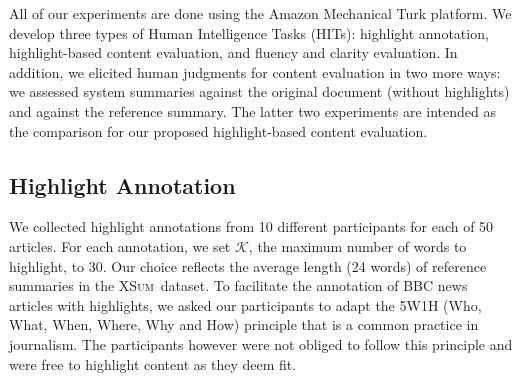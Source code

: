\documentclass[11pt,a4paper]{article}
\newcommand\highres{\textsc{HighRES}}
\newcommand\ptgen{\textsc{PtGen}}
\newcommand\tconv{\textsc{TConvS2S}}
\newcommand\xsum{\textsc{XSum}}
\begin{document}
All of our experiments are done using the Amazon Mechanical Turk platform. %
We develop three types of Human Intelligence Tasks (HITs): highlight annotation, highlight-based content evaluation, and fluency and clarity evaluation. In addition, we elicited human
judgments for content evaluation in two more ways: we assessed system summaries against the original document (without highlights) and against the reference summary. 
The latter two experiments are intended as the comparison for our proposed highlight-based content evaluation.

\subsection{Highlight Annotation} 

We collected highlight annotations from 10 different participants for each of 50 articles. For each annotation, we set  $\mathcal{K}$, the maximum number of words to highlight, to 30. Our choice reflects the average length (24 words) of reference summaries in the \xsum\ dataset. To facilitate the annotation of BBC news articles with highlights, we asked our participants to adapt the 5W1H (Who, What, When, Where, Why and How) principle \citep{Robertson1946} that is a common practice in journalism. The participants however were not obliged to follow this principle and were free to highlight content as they deem fit. 


\end{document}
